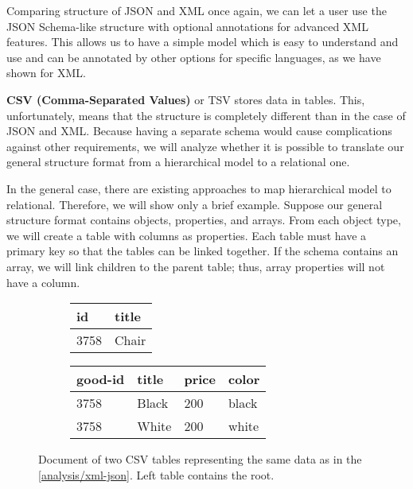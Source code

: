 Comparing structure of JSON and XML once again, we can let a user use the JSON Schema-like structure with optional annotations for advanced XML features. This allows us to have a simple model which is easy to understand and use and can be annotated by other options for specific languages, as we have shown for XML.

\smallskip

\textbf{CSV (Comma-Separated Values)} or TSV stores data in tables. This, unfortunately, means that the structure is completely different than in the case of JSON and XML. Because having a separate schema would cause complications against other requirements, we will analyze whether it is possible to translate our general structure format from a hierarchical model to a relational one.

In the general case, there are existing approaches \cite{10.1145/304181.304220, 10.1007/3-540-45271-0_10} to map hierarchical model to relational. Therefore, we will show only a brief example. Suppose our general structure format contains objects, properties, and arrays. From each object type, we will create a table with columns as properties. Each table must have a primary key so that the tables can be linked together. If the schema contains an array, we will link children to the parent table; thus, array properties will not have a column.

\begin{figure}[h!]\centering
  \begin{subfigure}{.5\textwidth}
    \centering
    \begin{tabular}{ll}\toprule
      id   & title \\ \midrule
      3758 & Chair \\ \bottomrule
    \end{tabular}%
  \end{subfigure}%
  \begin{subfigure}{.5\textwidth}
    \centering
    \begin{tabular}{llll}\toprule
      good-id & title & price & color \\ \midrule
      3758 & Black & 200 & black \\
      3758 & White & 200 & white \\ \bottomrule
    \end{tabular}
  \end{subfigure}
  \caption{Document of two CSV tables representing the same data as in the \autoref{analysis/xml-json}. Left table contains the root.}
  \label{analysis/csv}
\end{figure}

